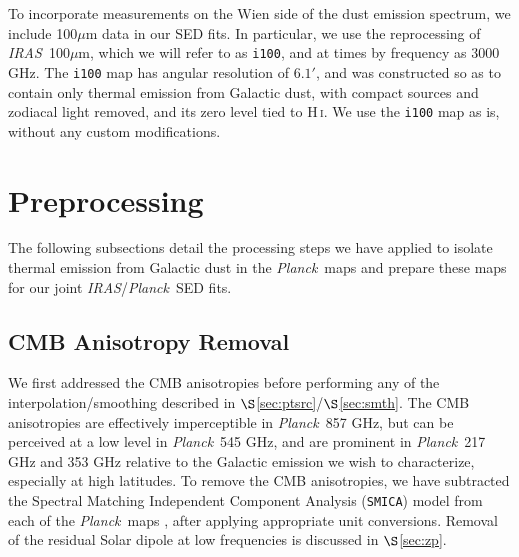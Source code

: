 \documentclass{emulateapj}
\newcommand{\IRAS}{{\it IRAS}}
\newcommand{\PLANCK}{{\it Planck}}
\begin{document}
To incorporate measurements on the Wien side of the dust emission spectrum, 
we include 100$\mu$m data in our SED fits. In particular, we use the 
\citet[henceforth SFD]{SFD} reprocessing of \IRAS~100$\mu$m, which we will 
refer to as \verb|i100|, and at times by frequency as 3000 GHz. The \verb|i100|
 map has angular resolution of $6.1'$, and was constructed so as to contain 
only thermal emission from Galactic dust, with compact sources and zodiacal 
light removed, and its zero level tied to H\,\textsc{i}. We use the \verb|i100|
map as is, without any custom modifications.


\section{Preprocessing}
\label{sec:prepro}

The following subsections detail the processing steps we have applied to 
isolate thermal emission from Galactic dust in the \PLANCK~maps and prepare
these maps for our joint \IRAS/\PLANCK~SED fits.

\subsection{CMB Anisotropy Removal}
\label{sec:cmb}
We first addressed the CMB anisotropies before performing any of the 
interpolation/smoothing described in $\S$\ref{sec:ptsrc}/$\S$\ref{sec:smth}. 
The CMB anisotropies are effectively imperceptible in \PLANCK~857 GHz, but can 
be perceived at a low level in \PLANCK~545 GHz, and are prominent in 
\PLANCK~217 GHz and 353 GHz relative to the Galactic emission we wish to 
characterize, especially at high latitudes. To remove the CMB anisotropies, we 
have subtracted the Spectral Matching Independent Component Analysis 
(\verb|SMICA|) model from each of the \PLANCK~maps \citep{smica}, after 
applying appropriate unit conversions. Removal of the residual Solar dipole at 
low frequencies is discussed in $\S$\ref{sec:zp}.
\end{document}
